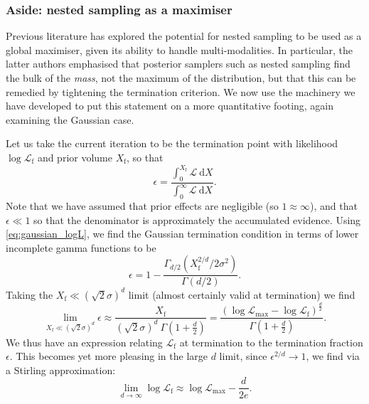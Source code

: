 \documentclass[usenatbib]{mnras}
\newcommand{\Like}{\mathcal{L}}
\begin{document}
\subsubsection*{Aside: nested sampling as a maximiser}
Previous literature \citep{Akrami_2010, Feroz_2011} has explored the potential for nested sampling to be used as a global maximiser, given its ability to handle multi-modalities. In particular, the latter authors emphasised that posterior samplers such as nested sampling find the bulk of the \textit{mass}, not the maximum of the distribution, but that this can be remedied by tightening the termination criterion. We now use the machinery we have developed to put this statement on a more quantitative footing, again examining the Gaussian case. 
\par
Let us take the current iteration to be the termination point with likelihood $\log\Like_\mathrm{f}$ and prior volume $X_\mathrm{f}$, so that
\begin{equation}
	\epsilon = \frac{\int_0^{X_\mathrm{f}} \mathcal{L}\ \mathrm{d}X}{\int_0^\infty \mathcal{L}\ \mathrm{d}X}.
\end{equation}
Note that we have assumed that prior effects are negligible (so $1\approx \infty$), and that $\epsilon \ll 1$ so that the denominator is approximately the accumulated evidence. Using \cref{eq:gaussian_logL}, we find the Gaussian termination condition in terms of lower incomplete gamma functions to be
\begin{equation}
\epsilon = 1- \frac{\Gamma_{d/2}\left(X_\mathrm{f}^{2/d}/2\sigma^2\right)}{\Gamma(d/2)}.
\end{equation}
Taking the $X_\mathrm{f}\ll (\sqrt{2}\sigma)^d$ limit (almost certainly valid at termination) we find
\begin{equation}\label{eq:Xf_approx}
    \lim_{X_\mathrm{f}\ll (\sqrt{2}\sigma)^d} \epsilon \approx \frac{X_\mathrm{f}}{(\sqrt{2}\sigma)^d \ \Gamma\left(1+\frac{d}{2}\right)} = \frac{(\log\mathcal{L}_\mathrm{max}-\log\mathcal{L}_\mathrm{f})^{\frac{d}{2}}}{\Gamma\left(1+\frac{d}{2}\right)}.
\end{equation}
We thus have an expression relating $\mathcal{L}_\mathrm{f}$ at termination to the termination fraction $\epsilon$. This becomes yet more pleasing in the large $d$ limit, since $\epsilon^{2/d}\to 1$, we find via a Stirling approximation:
\begin{equation}
    \lim_{d\to\infty} \log\mathcal{L}_\mathrm{f} \approx \log\mathcal{L}_\mathrm{max} - \frac{d}{2e}.
\end{equation}
\end{document}
